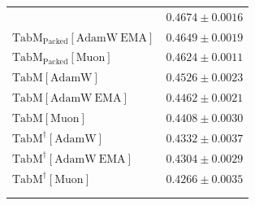 \begin{longtable}{p{}p{}}
{\begin{tabular}{ll}
{\footnotesize $\mathrm{TabM_{\text{Packed}}[AdamW]}$ } & {\footnotesize$0.4674 \pm 0.0016$}\\ 
{\footnotesize $\mathrm{TabM_{\text{Packed}}[AdamW\ EMA]}$ } & {\footnotesize$0.4649 \pm 0.0019$}\\ 
{\footnotesize $\mathrm{TabM_{\text{Packed}}[Muon]}$ } & {\footnotesize$0.4624 \pm 0.0011$}\\ 
{\footnotesize $\mathrm{TabM[AdamW]}$ } & {\footnotesize$0.4526 \pm 0.0023$}\\ 
{\footnotesize $\mathrm{TabM[AdamW\ EMA]}$ } & {\footnotesize$0.4462 \pm 0.0021$}\\ 
{\footnotesize $\mathrm{TabM[Muon]}$ } & {\footnotesize$0.4408 \pm 0.0030$}\\ 
{\footnotesize $\mathrm{TabM^\dagger[AdamW]}$ } & {\footnotesize$0.4332 \pm 0.0037$}\\ 
{\footnotesize $\mathrm{TabM^\dagger[AdamW\ EMA]}$ } & {\footnotesize$0.4304 \pm 0.0029$}\\ 
{\footnotesize $\mathrm{TabM^\dagger[Muon]}$ } & {\footnotesize$0.4266 \pm 0.0035$}\\ 
\bottomrule
\end{tabular}}

\\
\topalign{
\centering
\setlength\tabcolsep{2.5pt}
\renewcommand{\arraystretch}{0.8}
\begin{tabular}{ll}


\end{tabular}}
\end{longtable}
